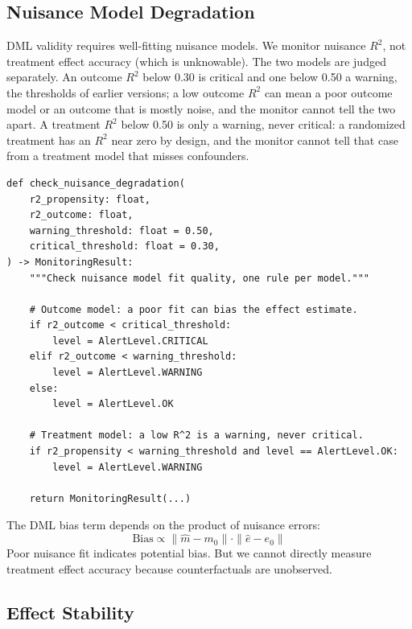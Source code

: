 \subsection{Nuisance Model Degradation}

DML validity requires well-fitting nuisance models. We monitor nuisance $R^2$, not treatment effect accuracy (which is unknowable). The two models are judged separately. An outcome $R^2$ below 0.30 is critical and one below 0.50 a warning, the thresholds of earlier versions; a low outcome $R^2$ can mean a poor outcome model or an outcome that is mostly noise, and the monitor cannot tell the two apart. A treatment $R^2$ below 0.50 is only a warning, never critical: a randomized treatment has an $R^2$ near zero by design, and the monitor cannot tell that case from a treatment model that misses confounders.

\begin{verbatim}
def check_nuisance_degradation(
    r2_propensity: float,
    r2_outcome: float,
    warning_threshold: float = 0.50,
    critical_threshold: float = 0.30,
) -> MonitoringResult:
    """Check nuisance model fit quality, one rule per model."""

    # Outcome model: a poor fit can bias the effect estimate.
    if r2_outcome < critical_threshold:
        level = AlertLevel.CRITICAL
    elif r2_outcome < warning_threshold:
        level = AlertLevel.WARNING
    else:
        level = AlertLevel.OK

    # Treatment model: a low R^2 is a warning, never critical.
    if r2_propensity < warning_threshold and level == AlertLevel.OK:
        level = AlertLevel.WARNING

    return MonitoringResult(...)
\end{verbatim}

\begin{keyinsight}
The DML bias term depends on the product of nuisance errors:
\[
\text{Bias} \propto \|\hat{m} - m_0\| \cdot \|\hat{e} - e_0\|
\]
Poor nuisance fit indicates potential bias. But we cannot directly measure treatment effect accuracy because counterfactuals are unobserved.
\end{keyinsight}

\subsection{Effect Stability}

